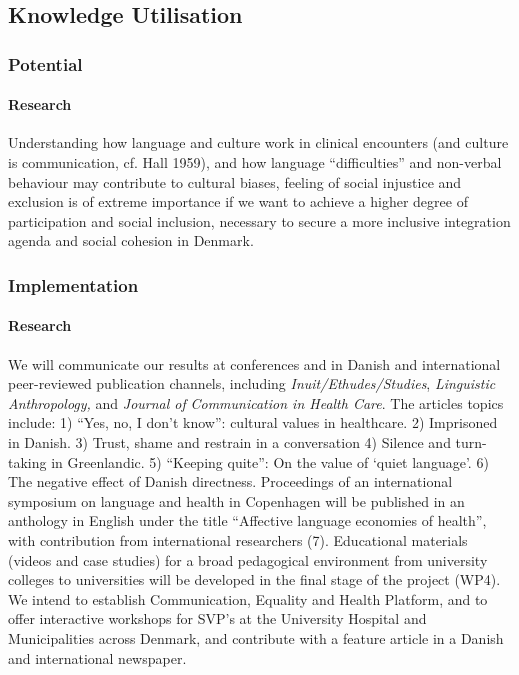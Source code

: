\documentclass[twocolumn, serif, rga, authordate]{jote-article}
\begin{document}
\subsection*{Knowledge Utilisation}



\subsubsection*{Potential}


\paragraph{Research}


Understanding how language and culture work in clinical encounters (and culture is communication, cf. Hall 1959), and how language
``difficulties'' and non-verbal behaviour may contribute to cultural biases, feeling of social injustice and exclusion is of extreme importance if we want to achieve a higher degree of participation and social inclusion, necessary to secure a more inclusive integration agenda and social cohesion in Denmark.


\subsubsection*{Implementation}



\paragraph{Research}


We will communicate our results at conferences and in Danish and international peer-reviewed publication channels, including
\emph{Inuit/Ethudes/Studies}, \emph{Linguistic Anthropology,} and
\emph{Journal of} \emph{Communication in Health Care}. The articles topics include: 1) ``Yes, no, I don't know'': cultural values in healthcare. 2) Imprisoned in Danish. 3) Trust, shame and restrain in a conversation 4) Silence and turn-taking in Greenlandic. 5) ``Keeping quite'': On the value of `quiet language'. 6) The negative effect of Danish directness. Proceedings of an international symposium on language and health in Copenhagen will be published in an anthology in English under the title ``Affective language economies of health'', with contribution from international researchers (7). Educational materials
(videos and case studies) for a broad pedagogical environment from university colleges to universities will be developed in the final stage of the project (WP4). We intend to establish Communication, Equality and Health Platform, and to offer interactive workshops for SVP's at the University Hospital and Municipalities across Denmark, and contribute with a feature article in a Danish and international newspaper.
\end{document}
